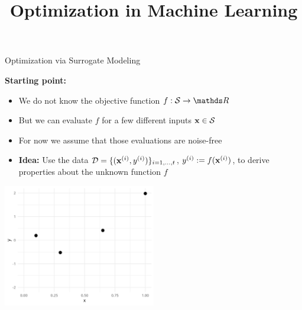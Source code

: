 \documentclass[11pt,compress,t,notes=noshow, xcolor=table]{beamer}
\title{Optimization in Machine Learning}
\date{}
\begin{document}


\begin{vbframe}{Optimization via Surrogate Modeling}

\textbf{Starting point:}
\begin{itemize}
\item We do not know the objective function $f: \mathcal{S} \to \R$
\item But we can evaluate $f$ for a few different inputs $\mathbf{x} \in \mathcal{S}$
\item For now we assume that those evaluations are noise-free

\item \textbf{Idea:}
  Use the data $\mathcal{D} = \{(\mathbf{x}^{(i)}, y^{(i)})\}_{i = 1, \ldots, t}$, $y^{(i)} := f(\mathbf{x}^{(i)})$, to derive properties about the unknown function $f$
\end{itemize}

\begin{center}
  \includegraphics[width = 0.5\textwidth]{figure_man/loop_0.png}
\end{center}

\end{vbframe}
\end{document}

